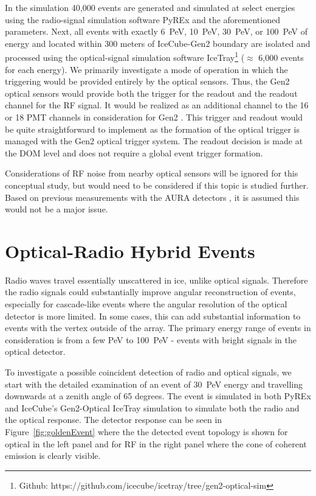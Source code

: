   In the simulation 40,000 events are generated and simulated at select energies 
  using the radio-signal simulation software PyREx and the aforementioned parameters. Next, all events with exactly 6~PeV, 10~PeV, 30~PeV, or 100~PeV of energy and located within 300 meters of IceCube-Gen2 boundary are isolated and processed using the optical-signal simulation software IceTray\footnote{Github: https://github.com/icecube/icetray/tree/gen2-optical-sim} ($\approx$ 6,000 events for each energy).
  We primarily investigate a mode of operation in which
  the triggering would be provided entirely by the optical sensors. Thus, the Gen2 optical sensors would provide both the trigger for the readout and the readout channel for the RF signal. It would be realized as an additional channel to the 16 or 18 PMT channels in consideration for Gen2 \citep{icecube_gen2_lom}.  This trigger and readout would be quite straightforward to implement as the formation of the optical trigger is managed with the Gen2 optical trigger system.
  The readout decision is made at the DOM level and does not require a global event trigger formation. 

  Considerations of RF noise from nearby optical sensors will be ignored for this conceptual study, but would need to be considered if this topic is studied further. Based on previous measurements with the AURA detectors \citep{aura}, it is assumed this would not be a major issue. 

\section{Optical-Radio Hybrid Events}

  Radio waves travel essentially unscattered in ice, unlike optical signals.
  Therefore the radio signals could substantially improve angular reconstruction of events, especially for cascade-like events where the angular resolution of the optical detector is more limited. 
  In some cases, this can add substantial information to events with the vertex outside of the array. 
  The primary energy range of events in consideration is from a few PeV to 100~PeV - events with bright signals in the optical detector.

  To investigate a possible coincident detection of radio and optical signals, we start with the detailed examination of an event of 30~PeV energy and travelling downwards at a zenith angle of 65 degrees. 
  The event is simulated in both PyREx and IceCube's Gen2-Optical IceTray simulation to simulate both the radio and the optical response. 
  The detector response can be seen in Figure~\ref{fig:goldenEvent} where the 
  the detected event topology is shown for optical in the left panel and for RF in the right panel
  where the cone of coherent emission is clearly visible.  

